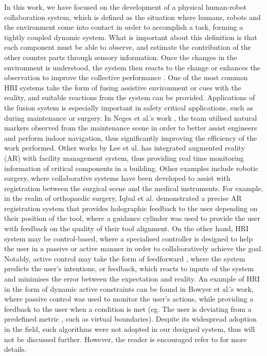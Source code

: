 In this work, we have focused on the development of a physical human-robot collaboration system, which is defined as the situation where humans, robots and the environment come into contact in order to accomplish a task, forming a tightly coupled dynamic system. What is important about this definition is that each component must be able to observe, and estimate the contribution of the other counter parts through sensory information. Once the changes in the environment is understood, the system then reacts to the change or enhances the observation to improve the collective performance \cite{ajoudani2018progress}. 
One of the most common HRI systems take the form of fusing assistive environment or cues with the reality, and suitable reactions from the system can be provided. Applications of the fusion system is especially important in safety critical applications, such as during maintenance or surgery.  In Neges et al.’s work \cite{neges2017combining}, the team utilised natural markers observed from the maintenance scene in order to better assist engineers and perform indoor navigation, thus significantly improving the efficiency of the work performed. Other works by Lee et al. \cite{lee2008product} has integrated augmented reality (AR) with facility management system, thus providing real time monitoring information of critical components in a building. Other examples include robotic surgery, where collaborative systems have been developed to assist with registration between the surgical scene and the medical instruments. For example, in the realm of orthopaedic surgery, Iqbal et al.  \cite{iqbal2021augmented} demonstrated a precise AR registration system that provides holographic feedback to the user depending on their position of the tool, where a guidance cylinder was used to provide the user with feedback on the quality of their tool alignment.  
On the other hand, HRI system may be control-based, where a specialised controller is designed to help the user in a passive or active manner in order to collaboratively achieve the goal. Notably, active control may take the form of feedforward \cite{magnanimo2014bayesian}, where the system predicts the user’s intentions, or feedback, which reacts to inputs of the system and minimises the error between the expectation and reality. An example of HRI in the form of dynamic active constraints can be found in Bowyer et al.’s work, where passive control was used to monitor the user’s actions, while providing a feedback to the user when a condition is met (eg. The user is deviating from a predefined metric \cite{bowyer2013active}, such as virtual boundaries). Despite its widespread adoption in the field, such algorithms were not adopted in our designed system, thus will not be discussed further. However, the reader is encouraged refer to \cite{bowyer2013active} for more details.

